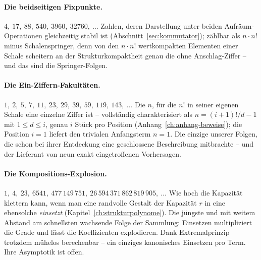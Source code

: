 \paragraph{Die beidseitigen Fixpunkte.}
$4,\ 17,\ 88,\ 540,\ 3960,\ 32760,\ \ldots$
Zahlen, deren Darstellung unter beiden Aufräum-Operationen
gleichzeitig stabil ist (Abschnitt~\ref{sec:kommutator}); zählbar
als $n\cdot n!$ minus Schalenspringer, denn von den $n\cdot n!$
wertkompakten Elementen einer Schale scheitern an der
Strukturkompaktheit genau die ohne Anschlag-Ziffer -- und das sind
die Springer-Folgen.

\paragraph{Die Ein-Ziffern-Fakultäten.}
$1,\ 2,\ 5,\ 7,\ 11,\ 23,\ 29,\ 39,\ 59,\ 119,\ 143,\ \ldots$
Die $n$, für die $n!$ in seiner eigenen Schale eine einzelne Ziffer
ist -- vollständig charakterisiert als $n=(i+1)!/d-1$ mit
$1\le d\le i$, genau $i$ Stück pro Position
(Anhang~\ref{ch:anhang-beweise}); die Position $i=1$ liefert den
trivialen Anfangsterm $n=1$. Die einzige unserer Folgen, die
schon bei ihrer Entdeckung eine geschlossene Beschreibung mitbrachte
-- und der Lieferant von neun exakt eingetroffenen Vorhersagen.

\paragraph{Die Kompositions-Explosion.}
$1,\ 4,\ 23,\ 6541,\ 477\,149\,751,\ 26\,594\,371\,862\,819\,905,\ \ldots$
Wie hoch die Kapazität klettern kann, wenn man eine randvolle
Gestalt der Kapazität $r$ in eine ebensolche \emph{einsetzt}
(Kapitel~\ref{ch:strukturpolynome}). Die jüngste und mit weitem
Abstand am schnellsten wachsende Folge der Sammlung: Einsetzen
multipliziert die Grade und lässt die Koeffizienten explodieren.
Dank Extremalprinzip trotzdem mühelos berechenbar -- ein einziges
kanonisches Einsetzen pro Term. Ihre Asymptotik ist offen.


